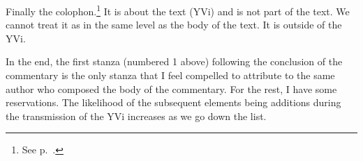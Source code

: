 Finally the colophon.\footnote{See p.~\pageref{WORKCOL}.} It is about the text (YVi) and is not part of the text. We cannot treat it as in the same level as the body of the text. It is outside of the YVi. 
 
In the end, the first stanza (numbered 1 above) following the conclusion of the commentary is the only stanza that I feel compelled to attribute to the same author who composed the body of the commentary. For the rest, I have some reservations. The likelihood of the subsequent elements being additions during the transmission of the YVi increases as we go down the list. 

